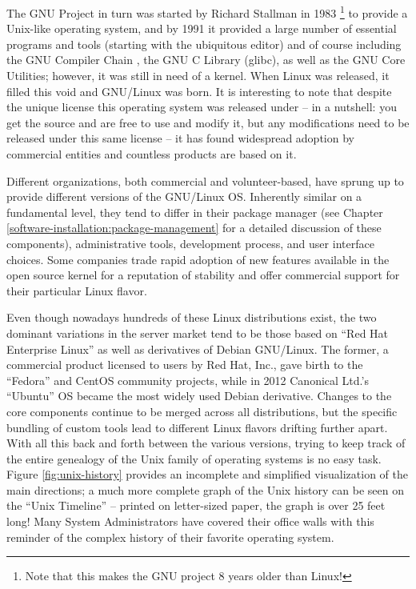 The GNU Project in turn was started by Richard
Stallman in 1983
\footnote{Note that this makes the GNU project 8 years
older than Linux!} to provide a Unix-like operating
system, and by 1991 it provided a large number of
essential programs and tools (starting with the
ubiquitous  editor) and of course
including the GNU Compiler Chain , the GNU C Library (glibc), as well as the GNU Core
Utilities; however, it was still
in need of a kernel.  When Linux was released, it
filled this void and GNU/Linux was
born.  It is interesting to note that despite the
unique license this operating system was released
under -- in a nutshell: you get the source and are
free to use and modify it, but any modifications need
to be released under this same license -- it has found
widespread adoption by commercial entities and
countless products are based on it.

Different organizations, both commercial and
volunteer-based, have sprung up to provide different
versions of the GNU/Linux OS.  Inherently similar on a
fundamental level, they tend to differ in their
package manager (see Chapter
\ref{software-installation:package-management} for a
detailed discussion of these components), administrative
tools, development process, and user interface
choices.  Some companies trade rapid adoption of new
features available in the open source kernel for a
reputation of stability and offer commercial support
for their particular Linux flavor.

Even though nowadays hundreds of these Linux
distributions exist, the two dominant variations in
the server market tend to be those based on ``Red Hat
Enterprise Linux'' as
well as derivatives of Debian GNU/Linux.  The former, a commercial product licensed
to users by Red Hat, Inc., gave birth to the
``Fedora'' and CentOS community
projects, while in 2012 Canonical Ltd.'s ``Ubuntu'' OS
became the most widely used Debian derivative.
Changes to the core components continue to be merged
across all distributions, but the specific bundling of
custom tools lead to different Linux flavors drifting
further apart.  \\

With all this back and forth between the various
versions, trying to keep track of the entire genealogy
of the Unix family of operating systems is no easy
task.  Figure \ref{fig:unix-history} provides an
incomplete and simplified visualization of the main
directions; a much more complete graph of the Unix
history can be seen on the ``Unix
Timeline''\cite{history:levenez-history} -- printed on
letter-sized paper, the graph is over 25 feet long!
Many System Administrators have covered their office
walls with this reminder of the complex history of
their favorite operating system.  \\

